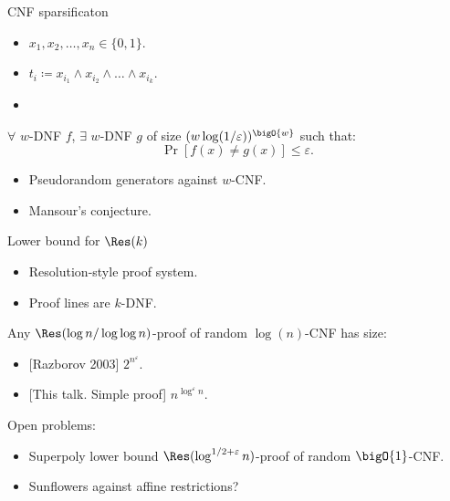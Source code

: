 \begin{frame}{CNF sparsificaton}

    \begin{itemize}
        \item $x_1, x_2, \dots, x_n \in \{0, 1\}$.
        \item $t_i \coloneqq x_{i_1} \land x_{i_2} \land \dots \land x_{i_k}$.
        \item {}
    \end{itemize}

    \pause
    \pause

    \begin{theorem}
        \alert{$\forall$} $w$-DNF $f$, \alert{$\exists$} $w$-DNF $g$ of size $(w \log(1 /
        \varepsilon))^{\bigO{w}}$ such that:
        $$
            \Pr[f(x) \neq g(x)] \le \varepsilon.
        $$
    \end{theorem}

    \pause
    \begin{itemize}
        \item Pseudorandom generators against $w$-CNF.
        \item Mansour's conjecture.
    \end{itemize}
    
\end{frame}

\begin{frame}{Lower bound for $\Res(k)$}

    \begin{itemize}
        \item Resolution-style proof system.
        \item Proof lines are $k$-DNF.
    \end{itemize}

    \pause
    \begin{theorem}
        Any $\Res(\log n / \log \log n)$-proof of random $\log(n)$-CNF has size:
        \begin{itemize}
            \item{} [Razborov 2003] $2^{n^{\varepsilon}}$.
            \item{} [This talk. Simple proof] $n^{\log^{\varepsilon} n}$.
        \end{itemize}
    \end{theorem}

    \pause
    \vspace{1cm}
    Open problems:
    \begin{itemize}
        \item Superpoly lower bound $\Res(\log^{1 / 2 + \varepsilon} n)$-proof of random $\bigO{1}$-CNF.
        \item Sunflowers against affine restrictions?
    \end{itemize}
\end{frame}

